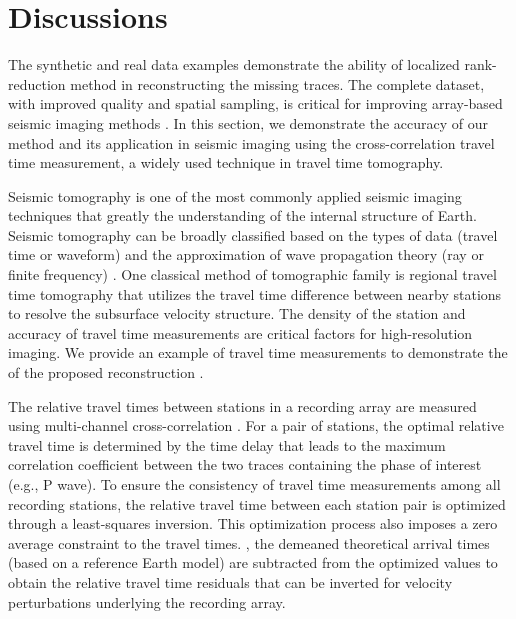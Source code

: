 \section*{Discussions}
The synthetic and real data examples demonstrate the ability of localized rank-reduction method in reconstructing the missing traces. The complete dataset, with improved quality and spatial sampling, is critical for improving array-based seismic imaging methods \cite{rost2002array, gu2010arrays}.  In this section, we demonstrate the accuracy of our method and its  application in seismic imaging using the cross-correlation travel time measurement, a widely used technique in travel time tomography.

Seismic tomography is one of the most commonly applied seismic imaging techniques that greatly  the understanding of the internal structure of Earth. Seismic tomography can be broadly classified based on the types of data (travel time or waveform) and the approximation of wave propagation theory (ray or finite frequency) \cite{liu2012seismic}. One classical method of  tomographic family is regional travel time tomography \cite{aki1977determination} that utilizes the travel time difference between nearby stations to resolve the subsurface velocity structure. The density of the station and  accuracy of travel time measurements are critical factors for high-resolution imaging. We provide an example of travel time measurements to demonstrate the  of the proposed reconstruction .

The relative travel times between stations in a recording array are measured using multi-channel cross-correlation \cite{vandecar1990determination}.  For a pair of stations, the optimal relative travel time is determined by the time delay that leads to the maximum correlation coefficient between the two traces containing the phase of interest (e.g., P wave). To ensure the consistency of travel time measurements among all recording stations, the relative travel time between each station pair is optimized through a least-squares inversion. This optimization process also imposes a zero average constraint to the travel times.  , the demeaned theoretical arrival times (based on a reference Earth model) are subtracted from the optimized values to obtain the relative travel time residuals that can be inverted for velocity perturbations underlying the recording array.

